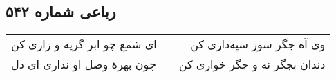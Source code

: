 \begin{center}
\section*{رباعی شماره ۵۴۲}
\label{sec:sh542}
\begin{longtable}{l p{0.5cm} r}
ای شمع چو ابر گریه و زاری کن
&&
وی آه جگر سوز سپه‌داری کن
\\
چون بهرهٔ وصل او نداری ای دل
&&
دندان بجگر نه و جگر خواری کن
\\
\end{longtable}
\end{center}
